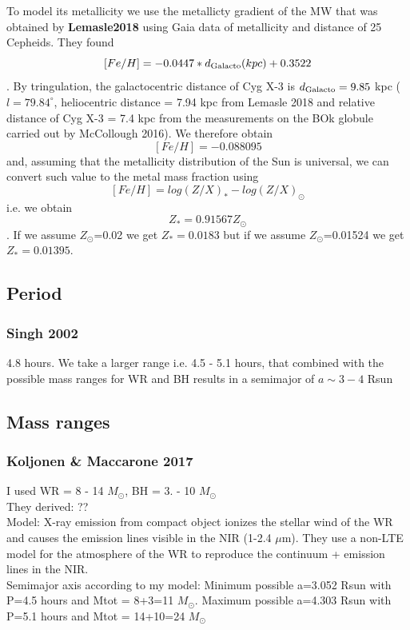 \documentclass[a4paper,titlepage]{book}     	%
\newcommand{\sun}{\ensuremath{_\odot}}
\newcommand{\msun}{\ensuremath{M\sun}}
\newcommand{\zsun}{\ensuremath{Z\sun}}
\begin{document}
To model its metallicity we use the metallicty gradient of the MW that was obtained by \textbf{Lemasle2018} using Gaia data of metallicity and distance of 25 Cepheids. They found \[[Fe/H]=-0.0447*d_{\rm Galacto}(kpc) + 0.3522\]. By tringulation, the galactocentric distance of Cyg X-3 is $d_{\rm Galacto} = 9.85$ kpc ($l=79.84^\circ$, heliocentric distance = 7.94 kpc from Lemasle 2018 and relative distance of Cyg X-3 = 7.4 kpc from the measurements on the BOk globule carried out by McCollough 2016). We therefore obtain \[[Fe/H] = -0.088095\] and, assuming that the metallicity distribution of the Sun is universal, we can convert such value to the metal mass fraction using \[[Fe/H] = log(Z/X)_* - log(Z/X)_\odot\] i.e. we obtain \[Z_* = 0.91567 \zsun\]. If we assume \zsun=0.02 we get $Z_*=0.0183$ but if we assume \zsun=0.01524 we get $Z_*=0.01395$.

\subsection{Period}
\subsubsection{Singh 2002} 4.8 hours. We take a larger range i.e. 4.5 - 5.1 hours, that combined with the possible mass ranges for WR and BH results in a semimajor of $a \sim 3-4 $ Rsun


\subsection{Mass ranges}
\subsubsection{Koljonen \& Maccarone 2017} I used WR = 8 - 14 \msun, BH = 3. - 10 \msun \\

They derived: ?? \\

Model: X-ray emission from compact object ionizes the stellar wind of the WR and causes the emission lines visible in the NIR (1-2.4 $\mu$m). They use a non-LTE model for the atmosphere of the WR to reproduce the continuum + emission lines in the NIR. \\

Semimajor axis according to my model: Minimum possible a=3.052 Rsun with P=4.5 hours and Mtot = 8+3=11 \msun .  Maximum possible a=4.303 Rsun with P=5.1 hours and Mtot = 14+10=24 \msun 
\end{document}
